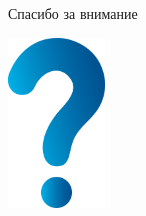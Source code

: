 \documentclass[aspectratio=169,pdf,hyperref={unicode},14pt]{beamer}
\begin{document}
\begin{frame}{Спасибо за внимание}
\centerline{\includegraphics[height=4.5cm]{question_mark_blue.png}}
\end{frame}
\end{document}

